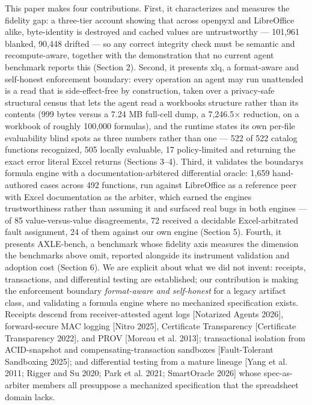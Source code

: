 \documentclass[
]{article}
\begin{document}
This paper makes four contributions. First, it characterizes and
measures the fidelity gap: a three-tier account showing that across
openpyxl and LibreOffice alike, byte-identity is destroyed and cached
values are untrustworthy --- 101,961 blanked, 90,448 drifted --- so any
correct integrity check must be semantic and recompute-aware, together
with the demonstration that no current agent benchmark reports this
(Section 2). Second, it presents xlq, a format-aware and self-honest
enforcement boundary: every operation an agent may run unattended is a
read that is side-effect-free by construction, taken over a privacy-safe
structural census that lets the agent read a workbook\textquotesingle s
structure rather than its contents (999 bytes versus a 7.24 MB full-cell
dump, a 7,246.5× reduction, on a workbook of roughly 100,000 formulas),
and the runtime states its own per-file evaluability blind spots as
three numbers rather than one --- 522 of 522 catalog functions
recognized, 505 locally evaluable, 17 policy-limited and returning the
exact error literal Excel returns (Sections 3--4). Third, it validates
the boundary\textquotesingle s formula engine with a
documentation-arbitered differential oracle: 1,659 hand-authored cases
across 492 functions, run against LibreOffice as a reference peer with
Excel documentation as the arbiter, which earned the
engine\textquotesingle s trustworthiness rather than assuming it and
surfaced real bugs in both engines --- of 85 value-versus-value
disagreements, 72 received a decidable Excel-arbitrated fault
assignment, 24 of them against our own engine (Section 5). Fourth, it
presents AXLE-bench, a benchmark whose fidelity axis measures the
dimension the benchmarks above omit, reported alongside its instrument
validation and adoption cost (Section 6). We are explicit about what we
did not invent: receipts, transactions, and differential testing are
established; our contribution is making the enforcement boundary
\emph{format-aware and self-honest} for a legacy artifact class, and
validating a formula engine where no mechanized specification exists.
Receipts descend from receiver-attested agent logs {[}Notarized Agents
2026{]}, forward-secure MAC logging {[}Nitro 2025{]}, Certificate
Transparency {[}Certificate Transparency 2022{]}, and PROV {[}Moreau et
al. 2013{]}; transactional isolation from ACID-snapshot and
compensating-transaction sandboxes {[}Fault-Tolerant Sandboxing 2025{]};
and differential testing from a mature lineage {[}Yang et al. 2011;
Rigger and Su 2020; Park et al. 2021; SmartOracle 2026{]} whose
spec-as-arbiter members all presuppose a mechanized specification that
the spreadsheet domain lacks.
\end{document}
